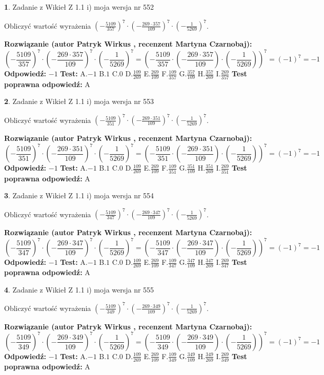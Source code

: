 \documentclass[12pt, a4paper]{article}
\theoremstyle{definition} %
\newtheorem{zad}{}
\newcommand{\zadStart}[1]{\begin{zad}#1\newline}
\newcommand{\zadStop}{\end{zad}}
\newcommand{\rozwStart}[2]{\noindent \textbf{Rozwiązanie (autor #1 , recenzent #2): }\newline}
\newcommand{\rozwStop}{\newline}
\newcommand{\odpStart}{\noindent \textbf{Odpowiedź:}\newline}
\newcommand{\odpStop}{\newline}
\newcommand{\testStart}{\noindent \textbf{Test:}\newline}
\newcommand{\testStop}{\newline}
\newcommand{\kluczStart}{\noindent \textbf{Test poprawna odpowiedź:}\newline}
\newcommand{\kluczStop}{\newline}
\begin{document}
\zadStart{Zadanie z Wikieł Z 1.1 i) moja wersja nr 552}

Obliczyć wartość wyrażenia $(-\frac{5109}{357})^{7} \cdot (-\frac{269 \cdot 357}{109})^{7} \cdot (-\frac{1}{5269})^{7}$.
\zadStop
\rozwStart{Patryk Wirkus}{Martyna Czarnobaj}
$$(-\frac{5109}{357})^{7} \cdot (-\frac{269 \cdot 357}{109})^{7} \cdot (-\frac{1}{5269})^{7} = (-\frac{5109}{357} \cdot (-\frac{269 \cdot 357}{109}) \cdot (-\frac{1}{5269}))^{7} = (-1)^{7} = -1$$
\rozwStop
\odpStart
$-1$
\odpStop
\testStart
A.$-1$ B.$1$ C.$0$ D.$\frac{109}{269}$ E.$\frac{269}{109}$
F.$\frac{109}{357}$ G.$\frac{357}{109}$
H.$\frac{357}{269}$
I.$\frac{269}{357}$
\testStop
\kluczStart
A
\kluczStop



\zadStart{Zadanie z Wikieł Z 1.1 i) moja wersja nr 553}

Obliczyć wartość wyrażenia $(-\frac{5109}{351})^{7} \cdot (-\frac{269 \cdot 351}{109})^{7} \cdot (-\frac{1}{5269})^{7}$.
\zadStop
\rozwStart{Patryk Wirkus}{Martyna Czarnobaj}
$$(-\frac{5109}{351})^{7} \cdot (-\frac{269 \cdot 351}{109})^{7} \cdot (-\frac{1}{5269})^{7} = (-\frac{5109}{351} \cdot (-\frac{269 \cdot 351}{109}) \cdot (-\frac{1}{5269}))^{7} = (-1)^{7} = -1$$
\rozwStop
\odpStart
$-1$
\odpStop
\testStart
A.$-1$ B.$1$ C.$0$ D.$\frac{109}{269}$ E.$\frac{269}{109}$
F.$\frac{109}{351}$ G.$\frac{351}{109}$
H.$\frac{351}{269}$
I.$\frac{269}{351}$
\testStop
\kluczStart
A
\kluczStop



\zadStart{Zadanie z Wikieł Z 1.1 i) moja wersja nr 554}

Obliczyć wartość wyrażenia $(-\frac{5109}{347})^{7} \cdot (-\frac{269 \cdot 347}{109})^{7} \cdot (-\frac{1}{5269})^{7}$.
\zadStop
\rozwStart{Patryk Wirkus}{Martyna Czarnobaj}
$$(-\frac{5109}{347})^{7} \cdot (-\frac{269 \cdot 347}{109})^{7} \cdot (-\frac{1}{5269})^{7} = (-\frac{5109}{347} \cdot (-\frac{269 \cdot 347}{109}) \cdot (-\frac{1}{5269}))^{7} = (-1)^{7} = -1$$
\rozwStop
\odpStart
$-1$
\odpStop
\testStart
A.$-1$ B.$1$ C.$0$ D.$\frac{109}{269}$ E.$\frac{269}{109}$
F.$\frac{109}{347}$ G.$\frac{347}{109}$
H.$\frac{347}{269}$
I.$\frac{269}{347}$
\testStop
\kluczStart
A
\kluczStop



\zadStart{Zadanie z Wikieł Z 1.1 i) moja wersja nr 555}

Obliczyć wartość wyrażenia $(-\frac{5109}{349})^{7} \cdot (-\frac{269 \cdot 349}{109})^{7} \cdot (-\frac{1}{5269})^{7}$.
\zadStop
\rozwStart{Patryk Wirkus}{Martyna Czarnobaj}
$$(-\frac{5109}{349})^{7} \cdot (-\frac{269 \cdot 349}{109})^{7} \cdot (-\frac{1}{5269})^{7} = (-\frac{5109}{349} \cdot (-\frac{269 \cdot 349}{109}) \cdot (-\frac{1}{5269}))^{7} = (-1)^{7} = -1$$
\rozwStop
\odpStart
$-1$
\odpStop
\testStart
A.$-1$ B.$1$ C.$0$ D.$\frac{109}{269}$ E.$\frac{269}{109}$
F.$\frac{109}{349}$ G.$\frac{349}{109}$
H.$\frac{349}{269}$
I.$\frac{269}{349}$
\testStop
\kluczStart
A
\kluczStop
\end{document}
